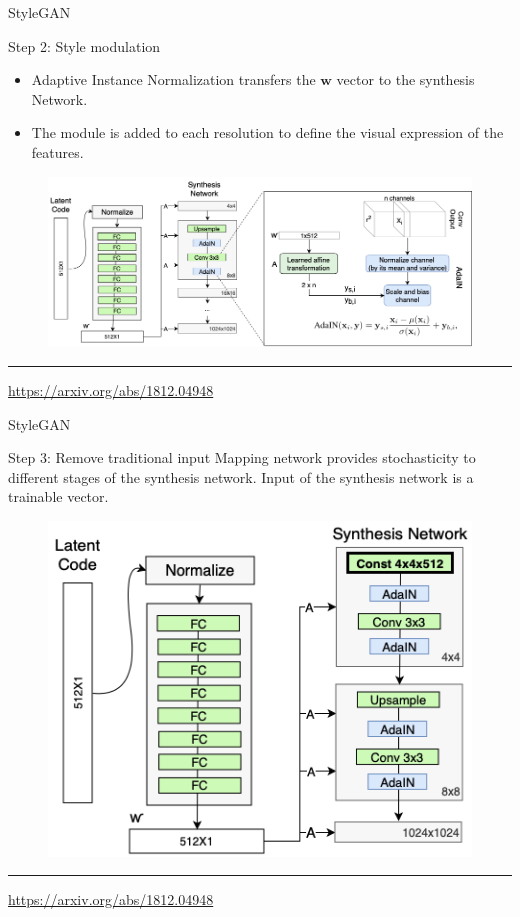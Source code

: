 \documentclass{beamer}
\newcommand{\bw}{\mathbf{w}}
\begin{document}
\begin{frame}{StyleGAN}
	\begin{block}{Step 2: Style modulation}
		\begin{itemize}
			\item Adaptive Instance Normalization transfers the $\bw$ vector to the synthesis Network.
			\item The module is added to each resolution to define the visual expression of the features.
		\end{itemize}
		\begin{figure}
			\centering
			\includegraphics[width=1.0\linewidth]{figs/stylegan_adain}
		\end{figure}
	\end{block}
	\vfill
	\hrule\medskip 
	{\scriptsize \href{https://arxiv.org/abs/1812.04948}{https://arxiv.org/abs/1812.04948}}
\end{frame}
\begin{frame}{StyleGAN}
	\begin{block}{Step 3: Remove traditional input}
		Mapping network provides stochasticity to different stages of the synthesis network. Input of the synthesis network is a trainable vector.
		\begin{figure}
			\centering
			\includegraphics[width=0.55\linewidth]{figs/stylegan_input}
		\end{figure}
	\end{block}
	\vfill
	\hrule\medskip 
	{\scriptsize \href{https://arxiv.org/abs/1812.04948}{https://arxiv.org/abs/1812.04948}}
\end{frame}
\end{document}
